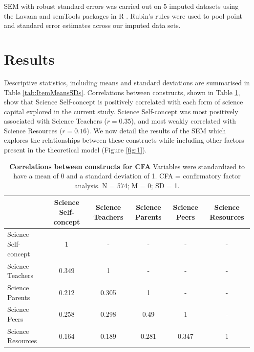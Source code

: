 SEM with robust standard errors \cite{huber1967behavior, white1982maximum} was carried out on 5 imputed datasets using the Lavaan \cite{rosseel2012lavaan} and semTools \cite{jorgensen2018package} packages in R \cite{team2013r}. Rubin's rules \cite{rubin2004multiple} were used to pool point and standard error estimates across our imputed data sets. 


\section*{Results}
\label{results}
Descriptive statistics, including means and standard deviations are summarised in Table \ref{tab:ItemMeansSDs}. Correlations between constructs, shown in Table \ref{tab:Correlations}, show that Science Self-concept is positively correlated with each form of science capital explored in the current study. Science Self-concept was most positively associated with Science Teachers ($r = 0.35$), and most weakly correlated with Science Resources ($r = 0.16$). We now detail the results of the SEM which explores the relationships between these constructs while including other factors present in the theoretical model (Figure \ref{fig:1}).

\begin{table}[h]
\label{tab:Correlations}       %
\begin{tabular}{lccccc}
\cline{2-6}
                  & Science Self-concept & Science Teachers & Science Parents & Science Peers & Science Resources \\ \hline
Science Self-concept  & 1                & -                & -               & -             & -                 \\
Science Teachers  & 0.349            & 1                & -               & -             & -                 \\
Science Parents   & 0.212            & 0.305            & 1               & -             & -                 \\
Science Peers     & 0.258            & 0.298            & 0.49            & 1             & -                 \\
Science Resources & 0.164            & 0.189            & 0.281           & 0.347         & 1                 \\ \hline
\end{tabular}
\caption{\textbf{Correlations between constructs for CFA}  Variables were standardized to have a mean of 0 and a standard deviation of 1. CFA =
confirmatory factor analysis. N = 574; M = 0; SD = 1.}
\end{table}

